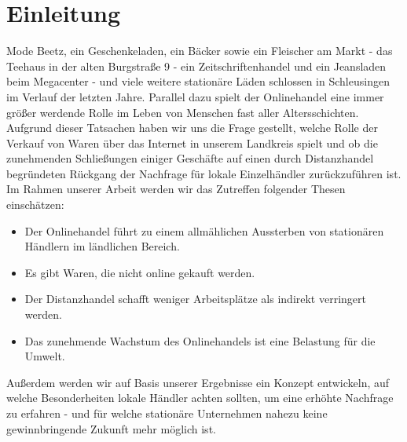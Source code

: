 \documentclass[a4paper, 12pt]{scrartcl}
\begin{document}
    \tableofcontents 
        \newpage

    \section{Einleitung}
    
    
    
    
    
    
    Mode Beetz, ein Geschenkeladen, ein Bäcker sowie ein Fleischer am Markt - das Teehaus in der alten Burgstraße 9 - ein Zeitschriftenhandel und ein Jeansladen beim Megacenter - und viele weitere stationäre Läden schlossen in Schleusingen im Verlauf der letzten Jahre. Parallel dazu spielt der Onlinehandel eine immer größer werdende Rolle im Leben von Menschen fast aller Altersschichten. Aufgrund dieser Tatsachen haben wir uns die Frage gestellt, welche Rolle der Verkauf von Waren über das Internet in unserem Landkreis spielt und ob die zunehmenden Schließungen einiger Geschäfte auf einen durch Distanzhandel begründeten Rückgang der Nachfrage für lokale Einzelhändler zurückzuführen ist.\\

\noindent Im Rahmen unserer Arbeit werden wir das Zutreffen folgender Thesen einschätzen:
\begin{itemize}
    \item Der Onlinehandel führt zu einem allmählichen Aussterben von stationären Händlern im ländlichen Bereich.
    
    \item Es gibt Waren, die nicht online gekauft werden.

    \item Der Distanzhandel schafft weniger Arbeitsplätze als indirekt verringert werden.
    
    \item Das zunehmende Wachstum des Onlinehandels ist eine Belastung für die Umwelt.\\
\end{itemize}

\noindent Außerdem werden wir auf Basis unserer Ergebnisse ein Konzept entwickeln, auf welche Besonderheiten lokale Händler achten sollten, um eine erhöhte Nachfrage zu erfahren - und für welche stationäre Unternehmen nahezu keine gewinnbringende Zukunft mehr möglich ist.








        \newpage
    
\end{document}
